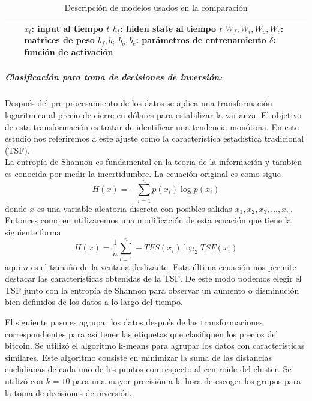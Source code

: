 \begin{table}
\begin{adjustbox}{width=0.95\textwidth}
\begin{tabular} {m{2cm} m{9cm} m{7cm}}
\begin{align}
		\end{align}
		& 
		$x_{t}$: input al tiempo $t$ \newline
		$h_{t}$: hiden state al tiempo $t$	\newline
		$W_{f},W_{i},W_{o},W_{c}$: matrices de peso\newline
		$b_{f},b_{i},b_{o},b_{c}$: parámetros de entrenamiento\newline
		$\delta$: función de activación
		\\
		\bottomrule
	\end{tabular}
	\end{adjustbox}
	\caption{Descripción de modelos usados en la comparación}
	\label{tab:Table8}
\end{table}


\subparagraph{Clasificación para toma de decisiones de inversión:} Después del pre-procesamiento de los datos se aplica una transformación logarítmica al precio de cierre en dólares para estabilizar la varianza. El objetivo de esta transformación es tratar de identificar una tendencia monótona. En este estudio nos referiremos a este ajuste como la característica estadística tradicional (TSF)\cite{pinedo-sanchezVibrationAnalysisBearings2020}.\\
La entropía de Shannon es fundamental en la teoría de la información y también es conocida por medir la incertidumbre. La ecuación original es como sigue
\[ H(x) = -\sum_{i=1}^{n}p(x_i)\log{p(x_i)} \]
donde $x$ es una variable aleatoria discreta con posibles salidas $x_1,x_2,x_3,...,x_n$. Entonces como en \cite{pinedo-sanchezVibrationAnalysisBearings2020} utilizaremos una modificación de esta ecuación que tiene la siguiente forma
\[ H(x) = \frac{1}{n} \sum_{i=1}^{n}-TFS(x_i)\log_2{TSF(x_i)} \]
aquí $n$ es el tamaño de la ventana deslizante. Esta última ecuación nos permite destacar las características obtenidas de la TSF. De este modo podemos elegir el TSF junto con la entropía de Shannon para observar un aumento o disminución bien definidos de los datos a lo largo del tiempo.

El siguiente paso es agrupar los datos después de las transformaciones correspondientes para así tener las etiquetas que clasifiquen los precios del bitcoin. Se utilizó el algoritmo k-means para agrupar los datos con características similares. Este algoritmo consiste en minimizar la suma de las distancias euclidianas de cada uno de los puntos con respecto al centroide del cluster. Se utilizó con $k=10$ para una mayor precisión a la hora de escoger los grupos para la toma de decisiones de inversión.

